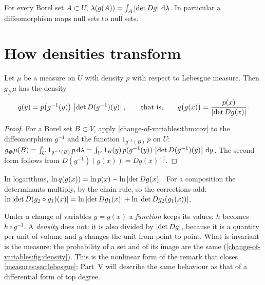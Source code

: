 \begin{notechapter}
\begin{corollary}\label{change-of-variables:cor:sets}
For every Borel set $A\subset U$,
$\lambda(g(A)) = \int_A\left|\det Dg\right|\,\mathrm{d}\lambda$. In particular a
diffeomorphism maps null sets to null sets.
\end{corollary}

\section{How densities transform}\label{change-of-variables:sec:density}

\begin{theorem}
\label{change-of-variables:thm:pushforward}
Let $\mu$ be a measure on $U$ with density $p$ with respect to Lebesgue
measure. Then $g_\#\mu$ has the density
\[
  q(y) = p\bigl(g^{-1}(y)\bigr)\,\left|\det D(g^{-1})(y)\right| ,
  \qquad\text{that is,}\qquad
  q\bigl(g(x)\bigr) = \frac{p(x)}{\left|\det Dg(x)\right|} .
\]
\end{theorem}

\begin{proof}
For a Borel set $B\subset V$, apply
\cref{change-of-variables:thm:cov} to the diffeomorphism $g^{-1}$ and
the function $1_{g^{-1}(B)}\,p$ on $U$:
$g_\#\mu(B) = \int_U1_{g^{-1}(B)}\,p\,\mathrm{d}\lambda
= \int_V1_B(y)\,p(g^{-1}(y))\,\left|\det D(g^{-1})(y)\right|\,\mathrm{d} y$. The second
form follows from $D(g^{-1})(g(x)) = Dg(x)^{-1}$.
\end{proof}

In logarithms, $\ln q(g(x)) = \ln p(x) - \ln\left|\det Dg(x)\right|$. For a
composition the determinants multiply, by the chain rule, so the
corrections add:
$\ln\left|\det D(g_2\circ g_1)(x)\right|
= \ln\left|\det Dg_1(x)\right| + \ln\left|\det Dg_2(g_1(x))\right|$.

\begin{keyidea}
Under a change of variables $y = g(x)$ a \emph{function} keeps its
values: $h$ becomes $h\circ g^{-1}$. A \emph{density} does not: it is
also divided by $\left|\det Dg\right|$, because it is a quantity per unit of
volume and $g$ changes the unit from point to point. What is invariant
is the measure: the probability of a set and of its image are the same
(\cref{change-of-variables:fig:density}). This is the nonlinear form
of the remark that closes \cref{measures:sec:lebesgue}; Part~V will
describe the same behaviour as that of a differential form of top
degree.
\end{keyidea}


\end{notechapter}
